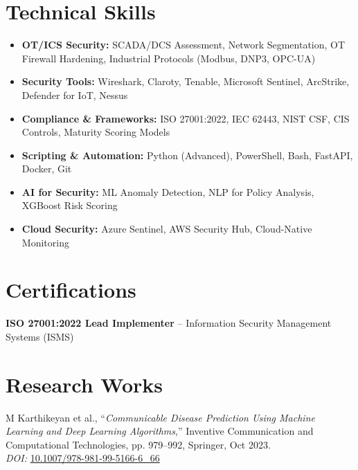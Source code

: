 \documentclass[11pt,letterpaper]{article}
\begin{document}
\section{Technical Skills}
\begin{itemize}
  \item \textbf{OT/ICS Security:} SCADA/DCS Assessment, Network Segmentation, OT Firewall Hardening, Industrial Protocols (Modbus, DNP3, OPC-UA)
  \item \textbf{Security Tools:} Wireshark, Claroty, Tenable, Microsoft Sentinel, ArcStrike, Defender for IoT, Nessus
  \item \textbf{Compliance \& Frameworks:} ISO 27001:2022, IEC 62443, NIST CSF, CIS Controls, Maturity Scoring Models
  \item \textbf{Scripting \& Automation:} Python (Advanced), PowerShell, Bash, FastAPI, Docker, Git
  \item \textbf{AI for Security:} ML Anomaly Detection, NLP for Policy Analysis, XGBoost Risk Scoring
  \item \textbf{Cloud Security:} Azure Sentinel, AWS Security Hub, Cloud-Native Monitoring
\end{itemize}

\section{Certifications}
\textbf{ISO 27001:2022 Lead Implementer} -- Information Security Management Systems (ISMS)

\section{Research Works}
M Karthikeyan et al., ``\textit{Communicable Disease Prediction Using Machine Learning and Deep Learning Algorithms},'' Inventive Communication and Computational Technologies, pp. 979--992, Springer, Oct 2023.\\
\textit{DOI:} \href{https://doi.org/10.1007/978-981-99-5166-6_66}{10.1007/978-981-99-5166-6\_66}
\end{document}
